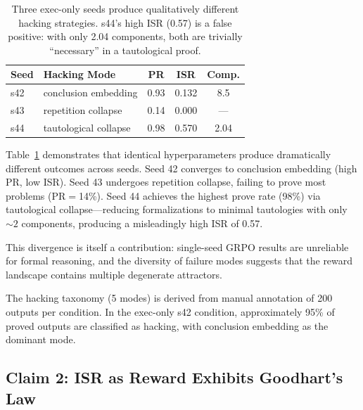 \documentclass[11pt,a4paper]{article}
\begin{document}
\begin{table}[t]
\centering
\small
\begin{tabular}{llccc}
\toprule
\textbf{Seed} & \textbf{Hacking Mode} & \textbf{PR} & \textbf{ISR} & \textbf{Comp.} \\
\midrule
s42 & conclusion embedding & 0.93 & 0.132 & 8.5 \\
s43 & repetition collapse & 0.14 & 0.000 & --- \\
s44 & tautological collapse & 0.98 & 0.570 & 2.04 \\
\bottomrule
\end{tabular}
\caption{Three exec-only seeds produce qualitatively different hacking strategies. s44's high ISR (0.57) is a false positive: with only 2.04 components, both are trivially ``necessary'' in a tautological proof.}
\label{tab:seeds}
\end{table}

Table~\ref{tab:seeds} demonstrates that identical hyperparameters produce dramatically different outcomes across seeds.
Seed 42 converges to conclusion embedding (high PR, low ISR).
Seed 43 undergoes repetition collapse, failing to prove most problems (PR$=$14\%).
Seed 44 achieves the highest prove rate (98\%) via tautological collapse---reducing formalizations to minimal tautologies with only ${\sim}2$ components, producing a misleadingly high ISR of 0.57.

This divergence is itself a contribution: single-seed GRPO results are unreliable for formal reasoning, and the diversity of failure modes suggests that the reward landscape contains multiple degenerate attractors.

The hacking taxonomy (5 modes) is derived from manual annotation of 200 outputs per condition. In the exec-only s42 condition, approximately 95\% of proved outputs are classified as hacking, with conclusion embedding as the dominant mode.

\subsection{Claim 2: ISR as Reward Exhibits Goodhart's Law}
\label{sec:claim2}
\end{document}

